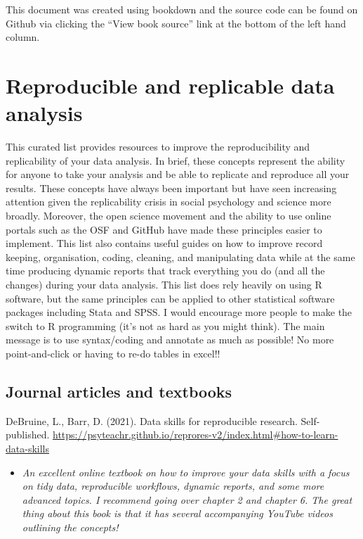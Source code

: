 \documentclass[
]{book}
\providecommand{\tightlist}{%
  \setlength{\itemsep}{0pt}\setlength{\parskip}{0pt}}
\begin{document}
This document was created using bookdown and the source code can be found on Github via clicking the ``View book source'' link at the bottom of the left hand column.

\hypertarget{reproducible-and-replicable-data-analysis}{%
\chapter{Reproducible and replicable data analysis}\label{reproducible-and-replicable-data-analysis}}

This curated list provides resources to improve the reproducibility and replicability of your data analysis. In brief, these concepts represent the ability for anyone to take your analysis and be able to replicate and reproduce all your results. These concepts have always been important but have seen increasing attention given the replicability crisis in social psychology and science more broadly. Moreover, the open science movement and the ability to use online portals such as the OSF and GitHub have made these principles easier to implement. This list also contains useful guides on how to improve record keeping, organisation, coding, cleaning, and manipulating data while at the same time producing dynamic reports that track everything you do (and all the changes) during your data analysis. This list does rely heavily on using R software, but the same principles can be applied to other statistical software packages including Stata and SPSS. I would encourage more people to make the switch to R programming (it's not as hard as you might think). The main message is to use syntax/coding and annotate as much as possible! No more point-and-click or having to re-do tables in excel!!

\hypertarget{journal-articles-and-textbooks}{%
\section{Journal articles and textbooks}\label{journal-articles-and-textbooks}}

DeBruine, L., Barr, D. (2021). Data skills for reproducible research. Self-published. \url{https://psyteachr.github.io/reprores-v2/index.html\#how-to-learn-data-skills}

\begin{itemize}
\tightlist
\item
  \emph{An excellent online textbook on how to improve your data skills with a focus on tidy data, reproducible workflows, dynamic reports, and some more advanced topics. I recommend going over chapter 2 and chapter 6. The great thing about this book is that it has several accompanying YouTube videos outlining the concepts!}
\end{itemize}
\end{document}
